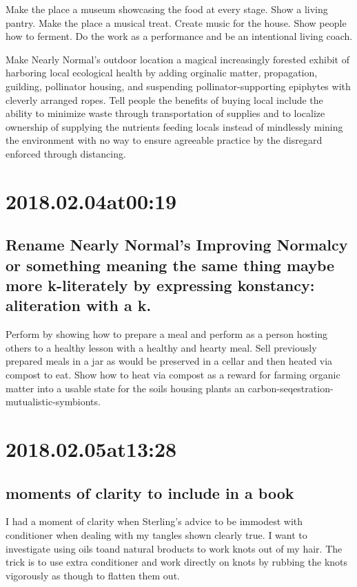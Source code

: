Make the place a museum showcasing the food at every stage.
Show a living pantry.
Make the place a musical treat.
Create music for the house.
Show people how to ferment.
Do the work as a performance and be an intentional living coach.

Make Nearly Normal's outdoor location a magical increasingly forested exhibit of harboring local ecological health by adding orginalic matter, propagation, guilding, pollinator housing, and suspending pollinator-supporting epiphytes with cleverly arranged ropes.
Tell people the benefits of buying local include the ability to minimize waste through transportation of supplies and to localize ownership of supplying the nutrients feeding locals instead of mindlessly mining the environment with no way to ensure agreeable practice by the disregard enforced through distancing.

\section*{ 2018.02.04at00:19 }
\subsection*{ Rename Nearly Normal's Improving Normalcy or something meaning the same thing maybe more k-literately by expressing konstancy: aliteration with a k. }
Perform by showing how to prepare a meal and perform as a person hosting others to a healthy lesson with a healthy and hearty meal.
Sell previously prepared meals in a jar as would be preserved in a cellar and then heated via compost to eat.
Show how to heat via compost as a reward for farming organic matter into a usable state for the soils housing plants an carbon-seqestration-mutualistic-symbionts.

\section*{ 2018.02.05at13:28 }
\subsection*{ moments of clarity to include in a book }
I had a moment of clarity when Sterling's advice to be immodest with conditioner when dealing with my tangles shown clearly true. I want to investigate using oils toand natural broducts to work knots out of my hair. The trick is to use extra conditioner and work directly on knots by rubbing the knots vigorously as though to flatten them out.

